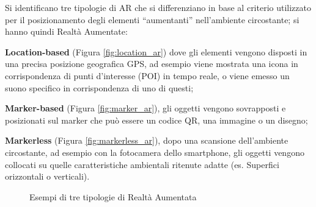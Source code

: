 Si identificano tre tipologie di AR che si differenziano in base al criterio utilizzato per il posizionamento degli elementi \enquote{aumentanti} nell'ambiente circostante; si hanno quindi Realtà Aumentate:

\begin{description}
    \item \textbf{Location-based} (Figura \ref{fig:location_ar}) dove gli elementi vengono disposti in una precisa posizione geografica GPS, ad esempio viene mostrata una icona in corrispondenza di punti d'interesse (POI) in tempo reale, o viene emesso un suono specifico in corrispondenza di uno di questi;
    \item \textbf{Marker-based} (Figura \ref{fig:marker_ar}), gli oggetti vengono sovrapposti e posizionati sul marker che può essere un codice QR, una immagine o un disegno;
    \item \textbf{Markerless} (Figura \ref{fig:markerless_ar}), dopo una scansione dell'ambiente circostante, ad esempio con la fotocamera dello smartphone, gli oggetti vengono collocati su quelle caratteristiche ambientali ritenute adatte (es. Superfici orizzontali o verticali).
\end{description}

\begin{figure}
    \centering
    \caption{Esempi di tre tipologie di Realtà Aumentata} 
    \label{fig:ARbased_type}
\end{figure}

